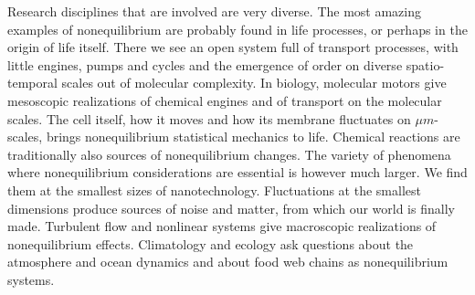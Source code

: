 Research disciplines that are involved are very diverse. The most amazing examples of
nonequilibrium are probably found in life processes, or perhaps in the origin of life
itself.  There we see an open system full of transport processes, with little engines, pumps
and cycles and the emergence of order on diverse spatio-temporal scales out of molecular
complexity. In biology, molecular motors give
mesoscopic realizations of chemical engines and of transport on the molecular scales.  The
cell itself, how it moves and how its membrane fluctuates on $\mu m$-scales, brings
nonequilibrium statistical mechanics to life.  Chemical reactions are traditionally also
sources of nonequilibrium changes.  The variety of phenomena where nonequilibrium considerations are essential is
however much larger.  We find them at the smallest sizes of nanotechnology. Fluctuations at
the smallest dimensions produce sources of noise and matter, from which our world is finally
made.  Turbulent flow and nonlinear systems give macroscopic realizations of nonequilibrium
effects.  Climatology and ecology ask questions about the atmosphere and ocean dynamics and
about food web chains as nonequilibrium systems.  





